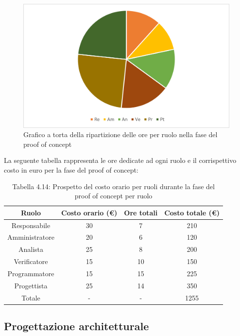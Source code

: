 \begin{figure}[H]
    \centering
    \includegraphics[scale=0.6]{img/grafi preventivo/torta/proof/complessivo.png}
    \caption{Grafico a torta della ripartizione delle ore per ruolo nella fase del proof of concept}
\end{figure}
La seguente tabella rappresenta le ore dedicate ad ogni ruolo e il corrispettivo costo in euro per la fase del proof of concept:
\begin{table}[h]
	\setlength\extrarowheight{5pt}
	\centering
	\begin{tabularx}{\textwidth}{|ccc|c|}
		\hline
		\rowcolor{white}
		\textbf{Ruolo} & \textbf{Costo orario (€)} & \textbf{Ore totali} & \textbf{Costo totale (€)} \\
		\hline
		Responsabile &30&7&210 \\
		Amministratore &20&6&120 \\
		Analista &25&8&200 \\
		Verificatore &15&10&150 \\
		Programmatore &15&15&225 \\
		Progettista &25&14&350 \\
		\hline
		Totale &-&-&1255 \\
		\hline
	\end{tabularx}
    \vspace{10pt}
	\caption{Tabella 4.14: Prospetto del costo orario per ruoli durante la fase del proof of concept per ruolo}
\end{table}
%
\newpage
\subsection{Progettazione architetturale}

